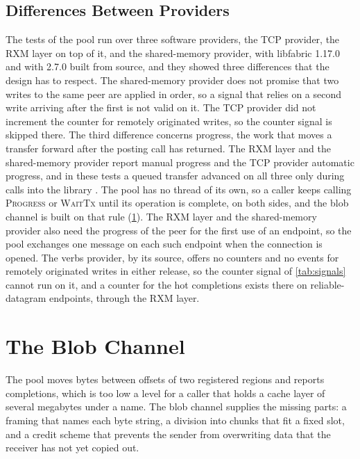 \subsection{Differences Between Providers}
\label{sec:providers}

The tests of the pool run over three software providers, the TCP provider,
the RXM layer on top of it, and the shared-memory provider, with libfabric
1.17.0 and with 2.7.0 built from source, and they showed three differences
that the design has to respect. The shared-memory provider does not promise
that two writes to the same peer are applied in order, so a signal that
relies on a second write arriving after the first is not valid on it. The
TCP provider did not increment the counter for remotely originated writes, so
the counter signal is skipped there. The third difference concerns progress,
the work that moves a transfer forward after the posting call has returned.
The RXM layer and the shared-memory provider report manual progress and the
TCP provider automatic progress, and in these tests a queued transfer
advanced on all three only during calls into the library
\citep{libfabric_repo}. The pool has no thread of its own, so a caller keeps
calling \textsc{Progress} or \textsc{WaitTx} until its operation is complete,
on both sides, and the blob channel is built on that rule
(\cref{sec:channel}). The RXM layer and the shared-memory provider also need
the progress of the peer for the first use of an endpoint, so the pool
exchanges one message on each such endpoint when the connection is opened.
The verbs provider, by its source, offers no counters and no events for
remotely originated writes in either release, so the counter signal of
\cref{tab:signals} cannot run on it, and a counter for the hot completions
exists there on reliable-datagram endpoints, through the RXM layer.


\section{The Blob Channel}
\label{sec:channel}

The pool moves bytes between offsets of two registered regions and reports
completions, which is too low a level for a caller that holds a cache layer
of several megabytes under a name. The blob channel supplies the missing
parts: a framing that names each byte string, a division into chunks that fit
a fixed slot, and a credit scheme that prevents the sender from overwriting
data that the receiver has not yet copied out.

